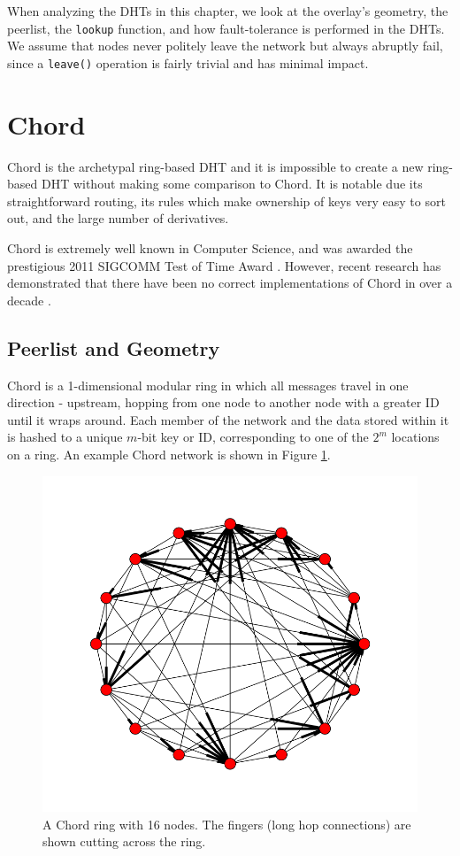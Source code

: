 When analyzing the DHTs in this chapter, we look at the overlay's geometry, the peerlist, the \texttt{lookup} function, and how fault-tolerance is performed in the DHTs.
We assume that nodes never politely leave the network but always abruptly fail, since a \texttt{leave()} operation is fairly trivial and has minimal impact.


\section{Chord}



Chord \cite{chord} is the archetypal ring-based DHT and it is impossible to create a new ring-based DHT without making some comparison to Chord.
It is notable due its straightforward routing, its rules which make ownership of keys very easy to sort out, and the large number of derivatives.



Chord is extremely well known in Computer Science, and was awarded the prestigious 2011 SIGCOMM Test of Time Award \cite{zave2012using}.
However, recent research has demonstrated that there have been no correct implementations of Chord in over a decade \cite{zave2012using}.




\subsection*{Peerlist and Geometry}
Chord is a 1-dimensional modular ring in which all messages travel in one direction - upstream, hopping from one node to another node with a greater ID until it wraps around.
Each member of the network and the data stored within it is hashed to a unique $m$-bit key or ID, corresponding to one of the $2^m$ locations on a ring. 
An example Chord network is shown in Figure \ref{fig:chord}.



\begin{figure}
	\centering
	\includegraphics[width=0.45\linewidth]{figs/chord}
	\caption{A Chord ring with 16 nodes.  The fingers (long hop connections) are shown cutting across the ring.}
	\label{fig:chord}
\end{figure}



